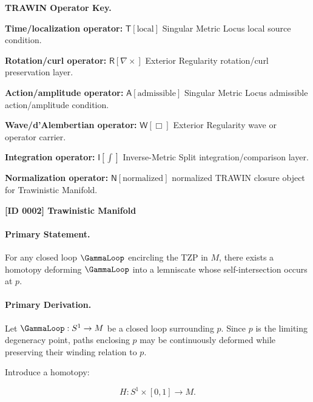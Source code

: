 \par\vspace{0.45\baselineskip}
\noindent\begin{minipage}[t]{\linewidth}
\begingroup
\small
\raggedright
\textbf{TRAWIN Operator Key.}\par
\noindent\textbf{Time/localization operator:} $\mathsf{T}\!\left[\mathrm{local}\right]$ Singular Metric Locus local source condition.\par
\noindent\textbf{Rotation/curl operator:} $\mathsf{R}\!\left[\nabla\times\right]$ Exterior Regularity rotation/curl preservation layer.\par
\noindent\textbf{Action/amplitude operator:} $\mathsf{A}\!\left[\mathrm{admissible}\right]$ Singular Metric Locus admissible action/amplitude condition.\par
\noindent\textbf{Wave/d'Alembertian operator:} $\mathsf{W}\!\left[\Box\right]$ Exterior Regularity wave or operator carrier.\par
\noindent\textbf{Integration operator:} $\mathsf{I}\!\left[\int\right]$ Inverse-Metric Split integration/comparison layer.\par
\noindent\textbf{Normalization operator:} $\mathsf{N}\!\left[\mathrm{normalized}\right]$ normalized TRAWIN closure object for Trawinistic Manifold.\par
\endgroup
\end{minipage}

\clearpage
\noindent\textbf{[ID 0002] Trawinistic Manifold}\par
\vspace{0.35em}
\paragraph{Primary Statement.}
For any closed loop $\GammaLoop$ encircling the TZP in $M$, there exists a homotopy deforming $\GammaLoop$ into a lemniscate whose self-intersection occurs at $p$.

\paragraph{Primary Derivation.}
Let $\GammaLoop:S^1\to M$ be a closed loop surrounding $p$. Since $p$ is the limiting degeneracy point, paths enclosing $p$ may be continuously deformed while preserving their winding relation to $p$.

Introduce a homotopy:

\begin{equation}
H:S^1\times[0,1]\to M .
\end{equation}

